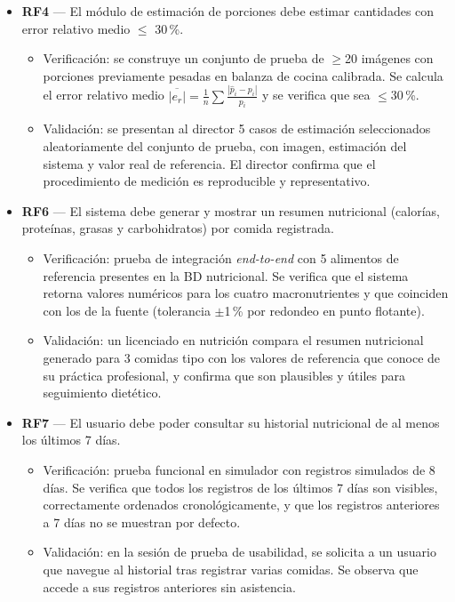 \documentclass[
11pt, %
]{charter}
\begin{document}
\begin{itemize}
\item \textbf{RF4} --- El módulo de estimación de porciones debe estimar cantidades con error relativo medio $\leq$ 30\,\%.
\begin{itemize}
	\item Verificación: se construye un conjunto de prueba de $\geq$20 imágenes con porciones previamente pesadas en balanza de cocina calibrada. Se calcula el error relativo medio $\overline{|e_r|} = \frac{1}{n}\sum \frac{|\hat{p}_i - p_i|}{p_i}$ y se verifica que sea $\leq$30\,\%.
	\item Validación: se presentan al director 5 casos de estimación seleccionados aleatoriamente del conjunto de prueba, con imagen, estimación del sistema y valor real de referencia. El director confirma que el procedimiento de medición es reproducible y representativo.
\end{itemize}

\item \textbf{RF6} --- El sistema debe generar y mostrar un resumen nutricional (calorías, proteínas, grasas y carbohidratos) por comida registrada.
\begin{itemize}
	\item Verificación: prueba de integración \textit{end-to-end} con 5 alimentos de referencia presentes en la BD nutricional. Se verifica que el sistema retorna valores numéricos para los cuatro macronutrientes y que coinciden con los de la fuente (tolerancia $\pm$1\,\% por redondeo en punto flotante).
	\item Validación: un licenciado en nutrición compara el resumen nutricional generado para 3 comidas tipo con los valores de referencia que conoce de su práctica profesional, y confirma que son plausibles y útiles para seguimiento dietético.
\end{itemize}

\item \textbf{RF7} --- El usuario debe poder consultar su historial nutricional de al menos los últimos 7 días.
\begin{itemize}
	\item Verificación: prueba funcional en simulador con registros simulados de 8 días. Se verifica que todos los registros de los últimos 7 días son visibles, correctamente ordenados cronológicamente, y que los registros anteriores a 7 días no se muestran por defecto.
	\item Validación: en la sesión de prueba de usabilidad, se solicita a un usuario que navegue al historial tras registrar varias comidas. Se observa que accede a sus registros anteriores sin asistencia.
\end{itemize}


\end{itemize}
\end{document}
